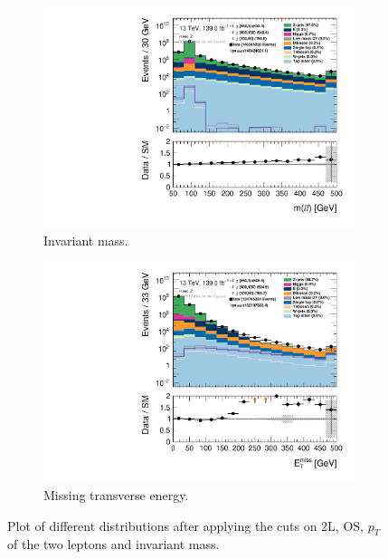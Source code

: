 \begin{figure}[H]
    \centering
    \begin{subfigure}[t!]{0.49\textwidth}
        \includegraphics[width=\textwidth]{Figures/MonoZcuts/hist1d_mll_mono_Z.pdf}
    \caption{Invariant mass.}
    \label{fig:mllDM}
    \end{subfigure}
    \begin{subfigure}[t!]{0.49\textwidth}
        \includegraphics[width=\textwidth]{Figures/MonoZcuts/hist1d_met_Et_mono_Z_1.pdf}
    \caption{Missing transverse energy.}
    \label{fig:metDM}
    \end{subfigure}
    \caption{Plot of different distributions after applying the cuts on 2L, OS, $p_T$ of the two leptons and invariant mass.}
    \label{fig:stepsDM1}
\end{figure}

